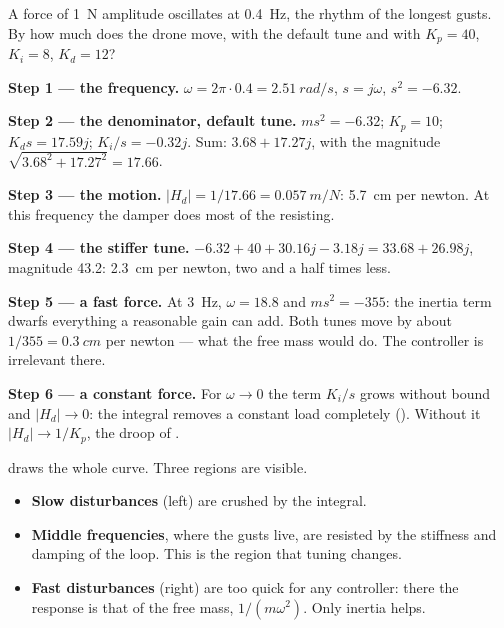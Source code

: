 \begin{example}
\label{ex:challenge-freq}
A force of \SI{1}{N} amplitude oscillates at \SI{0.4}{Hz}, the rhythm of the longest gusts. By how much does the drone move, with the default tune and with $K_p = 40$, $K_i = 8$, $K_d = 12$?

\textbf{Step 1 — the frequency.} $\omega = 2\pi \cdot 0.4 = \SI{2.51}{rad/s}$, $s = j\omega$, $s^2 = -6.32$.

\textbf{Step 2 — the denominator, default tune.} $ms^2 = -6.32$; $K_p = 10$; $K_ds = 17.59j$; $K_i/s = -0.32j$. Sum: $3.68 + 17.27j$, with the magnitude $\sqrt{3.68^2 + 17.27^2} = 17.66$.

\textbf{Step 3 — the motion.} $|H_d| = 1/17.66 = \SI{0.057}{m/N}$: \SI{5.7}{cm} per newton. At this frequency the damper does most of the resisting.

\textbf{Step 4 — the stiffer tune.} $-6.32 + 40 + 30.16j - 3.18j = 33.68 + 26.98j$, magnitude 43.2: \SI{2.3}{cm} per newton, two and a half times less.

\textbf{Step 5 — a fast force.} At \SI{3}{Hz}, $\omega = 18.8$ and $ms^2 = -355$: the inertia term dwarfs everything a reasonable gain can add. Both tunes move by about $1/355 = \SI{0.3}{cm}$ per newton — what the free mass would do. The controller is irrelevant there.

\textbf{Step 6 — a constant force.} For $\omega \to 0$ the term $K_i/s$ grows without bound and $|H_d| \to 0$: the integral removes a constant load completely (). Without it $|H_d| \to 1/K_p$, the droop of .
\end{example}


 draws the whole curve. Three regions are visible.
\begin{itemize}
  \item \textbf{Slow disturbances} (left) are crushed by the integral.
  \item \textbf{Middle frequencies}, where the gusts live, are resisted by the stiffness and damping of the loop. This is the region that tuning changes.
  \item \textbf{Fast disturbances} (right) are too quick for any controller: there the response is that of the free mass, $1/(m\omega^2)$. Only inertia helps.
\end{itemize}

